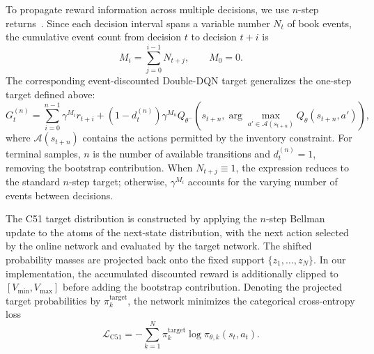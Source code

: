 \documentclass[11pt,a4paper]{article}
\begin{document}
To propagate reward information across multiple decisions,
we use $n$-step returns~\citep{suttonbarto2018}.
Since each decision interval spans a variable number
$N_t$ of book events, the cumulative event count from
decision $t$ to decision $t+i$ is
\begin{equation}
  M_i=\sum_{j=0}^{i-1}N_{t+j},
  \qquad M_0=0.
\end{equation}
The corresponding event-discounted Double-DQN target
generalizes the one-step target defined above:
\begin{equation}
  G_t^{(n)}
  =
  \sum_{i=0}^{n-1}\gamma^{M_i}r_{t+i}
  +
  (1-d_t^{(n)})\gamma^{M_n}
  Q_{\theta^-}\!\left(
    s_{t+n},
    \arg\max_{a'\in\mathcal A(s_{t+n})}
    Q_\theta(s_{t+n},a')
  \right),
\end{equation}
where $\mathcal A(s_{t+n})$ contains the actions permitted
by the inventory constraint. For terminal samples,
$n$ is the number of available transitions and
$d_t^{(n)}=1$, removing the bootstrap contribution.
When $N_{t+j}\equiv1$, the expression reduces to the
standard $n$-step target; otherwise, $\gamma^{M_i}$
accounts for the varying number of events between decisions.

The C51 target distribution is constructed by applying
the $n$-step Bellman update to the atoms of the next-state
distribution, with the next action selected by the online
network and evaluated by the target network.
The shifted probability masses are projected back onto
the fixed support $\{z_1,\ldots,z_N\}$.
In our implementation, the accumulated discounted reward
is additionally clipped to $[V_{\min},V_{\max}]$
before adding the bootstrap contribution.
Denoting the projected target probabilities by
$\pi_k^{\mathrm{target}}$, the network minimizes the
categorical cross-entropy loss
\begin{equation}
  \mathcal L_{\mathrm{C51}}
  =
  -\sum_{k=1}^{N}
  \pi_k^{\mathrm{target}}
  \log\pi_{\theta,k}(s_t,a_t).
\end{equation}
\end{document}
